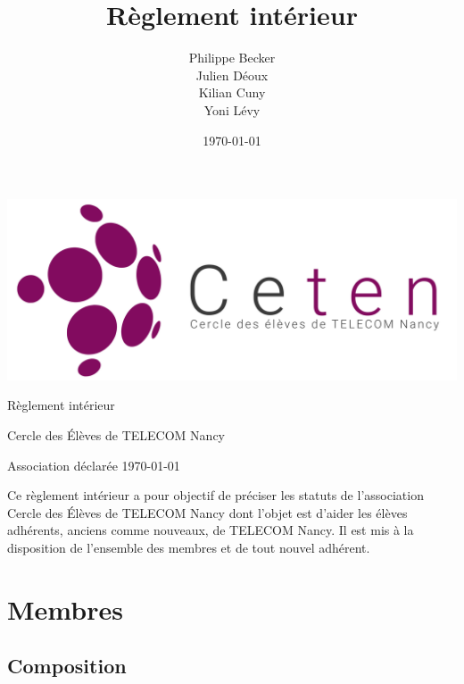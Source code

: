 \documentclass{article} %
\title{Règlement intérieur}
\author{Philippe Becker \\
	Julien Déoux \\
	Kilian Cuny \\
	Yoni Lévy}
\date\today
\begin{document}

	
	\begin{titlepage}
		\begin{center}
			\includegraphics[width=\textwidth]{images/ceten.png}\par
			\vspace{3cm}
			{\Huge \light Règlement intérieur}\par
			\vfill
			{\large Cercle des Élèves de TELECOM Nancy}\par
			{\large \light Association déclarée}
			\vfill
			{\light \today}\par
		\end{center}
	\end{titlepage}
	
	
	\tableofcontents

	
	\vfill
	\begin{center}
		{\light Ce règlement intérieur a pour objectif de préciser les statuts
		de l’association Cercle des Élèves de TELECOM Nancy dont l’objet est
		d’aider les élèves adhérents, anciens comme nouveaux, de TELECOM Nancy.
		Il est mis à la disposition de l’ensemble des membres et de tout nouvel
		adhérent.}
	\end{center}
	\vfill

	\clearpage



	\section{Membres}
		
		\subsection{Composition}
			
\end{document}
